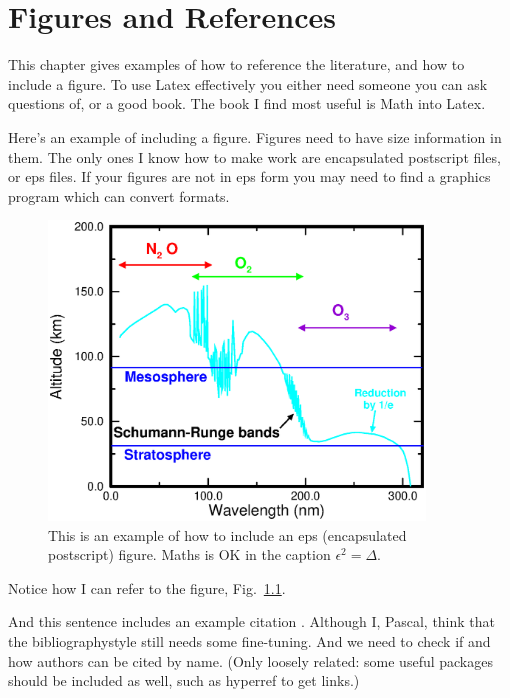 \setcounter{page}{1}  %

\chapter{Figures and References}

This chapter gives examples of how to reference the literature, and how to include a figure. To use Latex effectively you either need someone you can ask questions of, or a good book. The book I find most useful is Math into Latex.

Here's an example of including a figure. Figures need to have size information in them. The only ones I know how to make work are encapsulated postscript files, or eps files. If your figures are not in eps form you may need to find a graphics program which can convert formats.
\begin{figure}
  \begin{center}  %
    \includegraphics[width=10cm]{fig1.eps}
  \end{center}
\caption{This is an example of how to include an eps (encapsulated postscript) figure. Maths is OK in the caption $\epsilon^2 =\Delta$. }
\label{fig:Label}
\end{figure}
%
Notice how I can refer to the figure, Fig.~\ref{fig:Label}. 

And this sentence includes an example citation \cite{Biundo2016CompanionSurvey}. Although I, Pascal, think that the bibliographystyle still needs some fine-tuning. And we need to check if and how authors can be cited by name. (Only loosely related: some useful packages should be included as well, such as hyperref to get links.)
